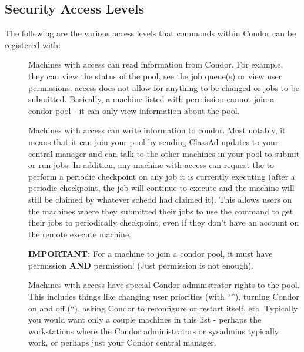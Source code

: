 \subsection{Security Access Levels}
\label{sec:Security-Access-Levels}

The following are the various access levels that commands within
Condor can be registered with:

\begin{description}

\item[] \label{dcperm:read} Machines with 
   access can read information from Condor.  For example, they can
   view the status of the pool, see the job queue(s) or view user
   permissions.   access does not allow for anything to
   be changed or jobs to be submitted.  Basically, a machine listed
   with  permission cannot join a condor pool - it can
   only view information about the pool.

\item[] \label{dcperm:write} Machines with
    access can write information to condor.  Most
   notably, it means that it can join your pool by sending ClassAd
   updates to your central manager and can talk to the other machines
   in your pool to submit or run jobs.  In addition, any machine with
    access can request the  to perform a
   periodic checkpoint on any job it is currently executing (after a
   periodic checkpoint, the job will continue to execute and the
   machine will still be claimed by whatever schedd had claimed it).
   This allows users on the machines where they submitted their jobs
   to use the  command to get their jobs to
   periodically checkpoint, even if they don't have an account on the
   remote execute machine.

   \textbf{IMPORTANT:} For a machine to join a condor pool, it must
   have  permission \textbf{AND}  permission!
   (Just  permission is not enough).

\item[] \label{dcperm:administrator} Machines
   with  access have special Condor
   administrator rights to the pool.  This includes things like
   changing user priorities (with ``''), turning
   Condor on and off (``), asking Condor to
   reconfigure or restart itself, etc.  Typically you would want only
   a couple machines in this list - perhaps the workstations where the
   Condor administrators or sysadmins typically work, or perhaps just
   your Condor central manager.


\end{description}
